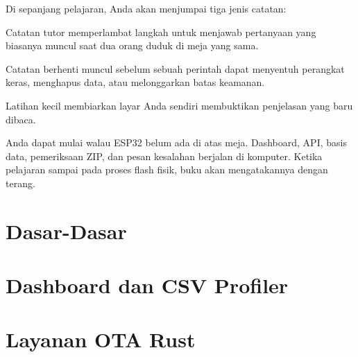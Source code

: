 \documentclass[11pt,letterpaper,openany]{book}
\begin{document}
Di sepanjang pelajaran, Anda akan menjumpai tiga jenis catatan:

\begin{mentorbox}
Catatan tutor memperlambat langkah untuk menjawab pertanyaan yang biasanya muncul saat dua orang duduk di meja yang sama.
\end{mentorbox}

\begin{warningbox}
Catatan berhenti muncul sebelum sebuah perintah dapat menyentuh perangkat keras, menghapus data, atau melonggarkan batas keamanan.
\end{warningbox}

\begin{checkpoint}
Latihan kecil membiarkan layar Anda sendiri membuktikan penjelasan yang baru dibaca.
\end{checkpoint}

Anda dapat mulai walau ESP32 belum ada di atas meja. Dashboard, API, basis data, pemeriksaan ZIP, dan pesan kesalahan berjalan di komputer. Ketika pelajaran sampai pada proses flash fisik, buku akan mengatakannya dengan terang.
\clearpage

\tableofcontents

\mainmatter

\part{Dasar-Dasar}



\part{Dashboard dan CSV Profiler}



\part{Layanan OTA Rust}


\end{document}
